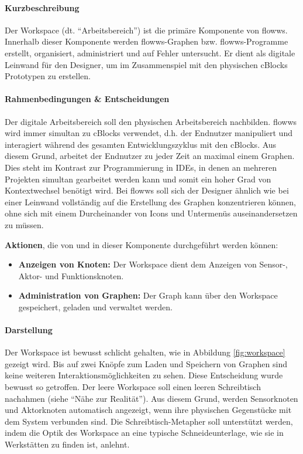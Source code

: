 \paragraph{Kurzbeschreibung} Der Workspace (dt. "`Arbeitsbereich"') ist die primäre Komponente von flowws. Innerhalb dieser Komponente werden flowws-Graphen bzw. flowws-Programme erstellt, organisiert, administriert und auf Fehler untersucht. Er dient als digitale Leinwand für den Designer, um im Zusammenspiel mit den physischen cBlocks Prototypen zu erstellen.

\paragraph{Rahmenbedingungen \& Entscheidungen} Der digitale Arbeitsbereich soll den physischen Arbeitsbereich nachbilden. flowws wird immer simultan zu cBlocks verwendet, d.h. der Endnutzer manipuliert und interagiert während des gesamten Entwicklungszyklus mit den cBlocks. Aus diesem Grund, arbeitet der Endnutzer zu jeder Zeit an maximal einem Graphen. Dies steht im Kontrast zur Programmierung in \acp{IDE}, in denen an mehreren Projekten simultan gearbeitet werden kann und somit ein hoher Grad von Kontextwechsel benötigt wird. Bei flowws soll sich der Designer ähnlich wie bei einer Leinwand vollständig auf die Erstellung des Graphen konzentrieren können, ohne sich mit einem Durcheinander von Icons und Untermenüs auseinandersetzen zu müssen. 

\textbf{Aktionen}, die von und in dieser Komponente durchgeführt werden können: 
\begin{itemize}
    \item \textbf{Anzeigen von Knoten:} Der Workspace dient dem Anzeigen von Sensor-, Aktor- und Funktionsknoten. 
    \item \textbf{Administration von Graphen:} Der Graph kann über den Workspace gespeichert, geladen und verwaltet werden. 
\end{itemize}

\paragraph{Darstellung} Der Workspace ist bewusst schlicht gehalten, wie in Abbildung \ref{fig:workspace} gezeigt wird. Bis auf zwei Knöpfe zum Laden und Speichern von Graphen sind keine weiteren Interaktionsmöglichkeiten zu sehen. Diese Entscheidung wurde bewusst so getroffen. Der leere Workspace soll einen leeren Schreibtisch nachahmen (siehe "`Nähe zur Realität"'). Aus diesem Grund, werden Sensorknoten und Aktorknoten automatisch angezeigt, wenn ihre physischen Gegenstücke mit dem System verbunden sind. Die Schreibtisch-Metapher soll unterstützt werden, indem die Optik des Workspace an eine typische Schneideunterlage, wie sie in Werkstätten zu finden ist, anlehnt.

